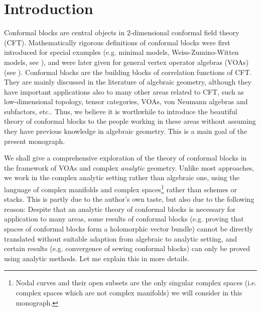 \documentclass[12pt,b5paper,notitlepage]{report}
\theoremstyle{definition}
\theoremstyle{plain}
\numberwithin{equation}{section}
\begin{document}







	
	
	
\chapter*{Introduction}	
	
	
	
Conformal blocks are central objects in  $2$-dimensional conformal field theory (CFT). Mathematically rigorous definitions of conformal blocks were first introduced for special examples (e.g. minimal models, Weiss-Zumino-Witten models, see \cite{BFM91,TUY89}), and were later given for general vertex operator algebras (VOAs) (see \cite{Zhu94,FB04}). Conformal blocks  are the building blocks of correlation functions of CFT. They are mainly discussed in the literature of algebraic geometry, although they have important applications also to many other areas related to CFT, such as low-dimensional topology, tensor categories, VOAs, von Neumann algebras and subfactors, etc.. Thus, we believe it is worthwhile to introduce the beautiful theory of conformal blocks to the people working in these areas without assuming they have previous knowledge in algebraic geometry. This is a main goal of the present monograph.

We shall give a comprehensive exploration of the theory of conformal blocks in the framework of VOAs and complex \emph{analytic} geometry. Unlike most approaches, we work in the complex analytic setting rather than algebraic one, using the language of complex manifolds and complex spaces\footnote{Nodal curves and their open subsets are the only singular complex spaces (i.e. complex spaces which are not complex manifolds) we will consider in this monograph.} rather than schemes or stacks. This is partly due to the author's own taste, but also due to the following reason: Despite that an analytic theory of conformal blocks is necessary for application to many areas,  some  results of conformal blocks (e.g. proving that spaces of conformal blocks form a holomorphic vector bundle) cannot be directly translated without suitable adaption from algebraic to  analytic setting, and certain results (e.g. convergence of sewing conformal blocks) can only be proved using analytic methods. Let me explain this in more details.
\end{document}
